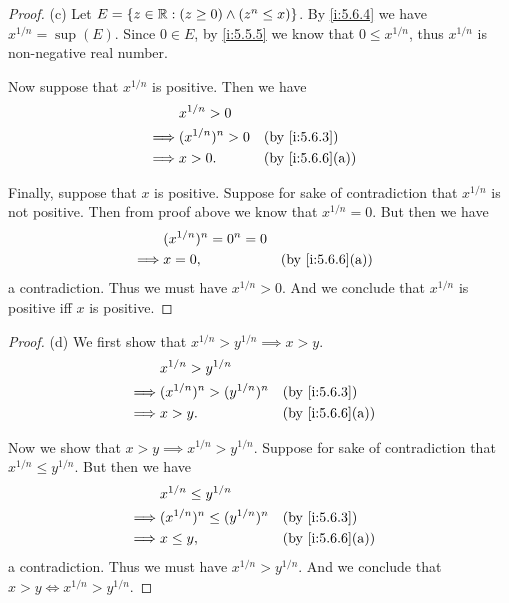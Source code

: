 \begin{proof}{(c)}
  Let \(E = \left\lbrace z \in \mathbb{R} : (z \geq 0) \land (z^n \leq x)\right\rbrace\).
  By \cref{i:5.6.4} we have \(x^{1 / n} = \sup(E)\).
  Since \(0 \in E\), by \cref{i:5.5.5} we know that \(0 \leq x^{1 / n}\), thus \(x^{1 / n}\) is non-negative real number.

  Now suppose that \(x^{1 / n}\) is positive.
  Then we have
  \begin{align*}
             & x^{1 / n} > 0                          \\
    \implies & (x^{1 / n})^n > 0 &  & \by{i:5.6.3}    \\
    \implies & x > 0.            &  & \by{i:5.6.6}[a] \\
  \end{align*}

  Finally, suppose that \(x\) is positive.
  Suppose for sake of contradiction that \(x^{1 / n}\) is not positive.
  Then from proof above we know that \(x^{1 / n} = 0\).
  But then we have
  \begin{align*}
             & (x^{1 / n})^n = 0^n = 0                      \\
    \implies & x = 0,                  &  & \by{i:5.6.6}[a]
  \end{align*}
  a contradiction.
  Thus we must have \(x^{1 / n} > 0\).
  And we conclude that \(x^{1 / n}\) is positive iff \(x\) is positive.
\end{proof}

\begin{proof}{(d)}
  We first show that \(x^{1 / n} > y^{1 / n} \implies x > y\).
  \begin{align*}
             & x^{1 / n} > y^{1 / n}                              \\
    \implies & (x^{1 / n})^n > (y^{1 / n})^n &  & \by{i:5.6.3}    \\
    \implies & x > y.                        &  & \by{i:5.6.6}[a]
  \end{align*}

  Now we show that \(x > y \implies x^{1 / n} > y^{1 / n}\).
  Suppose for sake of contradiction that \(x^{1 / n} \leq y^{1 / n}\).
  But then we have
  \begin{align*}
             & x^{1 / n} \leq y^{1 / n}                              \\
    \implies & (x^{1 / n})^n \leq (y^{1 / n})^n &  & \by{i:5.6.3}    \\
    \implies & x \leq y,                        &  & \by{i:5.6.6}[a]
  \end{align*}
  a contradiction.
  Thus we must have \(x^{1 / n} > y^{1 / n}\).
  And we conclude that \(x > y \iff x^{1 / n} > y^{1 / n}\).
\end{proof}

